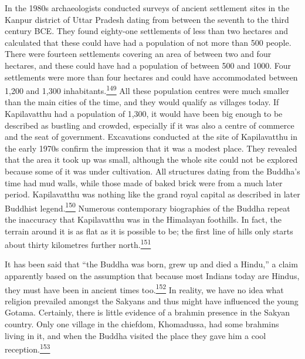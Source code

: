 In the 1980s archaeologists conducted surveys of ancient settlement
sites in the Kanpur district of Uttar Pradesh dating from between the
seventh to the third century BCE. They found eighty-one settlements of
less than two hectares and calculated that these could have had a
population of not more than 500 people. There were fourteen settlements
covering an area of between two and four hectares, and these could have
had a population of between 500 and 1000. Four settlements were more
than four hectares and could have accommodated between 1,200 and 1,300
inhabitants.\label{footprints_split_008.html_fnref149}\hyperref[footprints_split_024.htmlux5cux23fn149]{\textsuperscript{149}}
All these population centres were much smaller than the main cities of
the time, and they would qualify as villages today. If Kapilavatthu had
a population of 1,300, it would have been big enough to be described as
bustling and crowded, especially if it was also a centre of commerce and
the seat of government. Excavations conducted at the site of
Kapilavatthu in the early 1970s confirm the impression that it was a
modest place. They revealed that the area it took up was small, although
the whole site could not be explored because some of it was under
cultivation. All structures dating from the Buddha's time had mud walls,
while those made of baked brick were from a much later period.
Kapilavatthu was nothing like the grand royal capital as described in
later Buddhist
legend.\label{footprints_split_008.html_fnref150}\hyperref[footprints_split_024.htmlux5cux23fn150]{\textsuperscript{150}}
Numerous contemporary biographies of the Buddha repeat the inaccuracy
that Kapilavatthu was in the Himalayan foothills. In fact, the terrain
around it is as flat as it is possible to be; the first line of hills
only starts about thirty kilometres further
north.\label{footprints_split_008.html_fnref151}\hyperref[footprints_split_024.htmlux5cux23fn151]{\textsuperscript{151}}

It has been said that ``the Buddha was born, grew up and died a Hindu,''
a claim apparently based on the assumption that because most Indians
today are Hindus, they must have been in ancient times
too.\label{footprints_split_008.html_fnref152}\hyperref[footprints_split_024.htmlux5cux23fn152]{\textsuperscript{152}}
In reality, we have no idea what religion prevailed amongst the Sakyans
and thus might have influenced the young Gotama. Certainly, there is
little evidence of a brahmin presence in the Sakyan country. Only one
village in the chiefdom, Khomadussa, had some brahmins living in it, and
when the Buddha visited the place they gave him a cool
reception.\label{footprints_split_008.html_fnref153}\hyperref[footprints_split_024.htmlux5cux23fn153]{\textsuperscript{153}}

